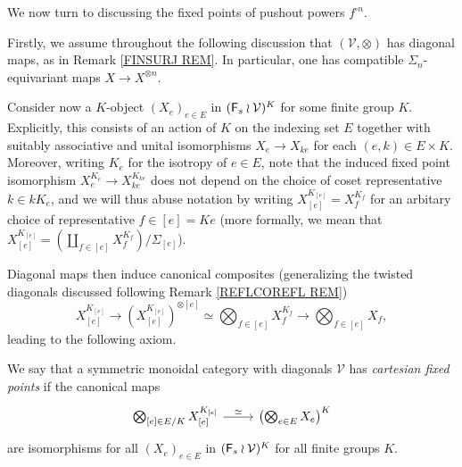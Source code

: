 \documentclass[a4paper,10pt]{article}%
\begin{document}
We now turn to discussing the fixed points of
pushout powers $f^{\square n}$.

Firstly, we assume throughout the following discussion that 
$(\mathcal{V},\otimes)$
has diagonal maps, as in
Remark \ref{FINSURJ REM}.
In particular, one has compatible
$\Sigma_n$-equivariant
maps $X \to X^{\otimes n}$.

Consider now a $K$-object
$(X_e)_{e \in E}$ in $(\mathsf{F}_s \wr \mathcal{V})^K$ for some finite group $K$.
Explicitly, this consists of an action of $K$ on the indexing set $E$ together with suitably associative and unital isomorphisms
$X_e \to X_{ke}$
for each $(e,k) \in E \times K$.
Moreover, writing $K_e$ for the isotropy of $e \in E$,
note that the induced fixed point isomorphism
$X_e^{K_e} \to X_{k e}^{K_{ke}}$
does not depend on the choice of coset representative $k \in k K_e$,
and we will thus abuse notation
by writing
$X_{[e]}^{K_{[e]}} = X_f^{K_f}$ for an arbitary choice of representative $f \in [e] = Ke$
(more formally, we mean that 
$X_{[e]}^{K_{[e]}} = \left(\coprod_{f\in[e]}
X_f^{K_f}\right)/\Sigma_{[e]}$).

Diagonal maps then induce canonical composites
(generalizing the twisted diagonals discussed following Remark \ref{REFLCOREFL REM})
\[
	X_{[e]}^{K_{[e]}}
\to
	\left( X_{[e]}^{K_{[e]}} \right)^{\otimes [e]}
\simeq
	\bigotimes_{f \in [e]} X_f^{K_f}
\to
	\bigotimes_{f \in [e]} X_f,
\]
leading to the following axiom.

\begin{definition}\label{CARTFIX DEF}
We say that a symmetric monoidal category
with diagonals $\mathcal{V}$ has \textit{cartesian fixed points} if the canonical maps
\begin{equation}\label{CARTFIX EQ}
\begin{tikzcd}
\bigotimes_{[e] \in E/K} X_{[e]}^{K_{[e]}}
	\ar{r}{\simeq} &
\left( \bigotimes_{e \in E} X_e \right)^K
\end{tikzcd}
\end{equation}
are isomorphisms for all $(X_e)_{e \in E}$ in $(\mathsf F_s \wr \mathcal V)^K$ for all finite groups $K$.
\end{definition}
\end{document}
